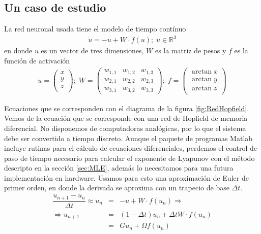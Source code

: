 \subsection{Un caso de estudio}

La red neuronal usada tiene el modelo de tiempo contínuo
\begin{eqnarray}\label{eq:ModTiempCont}
\dot{u} = -u + W \cdot f(u); \; u \in \mathbb{R}^3
\end{eqnarray}
en donde $u$ es un vector de tres dimensiones, $W$ es la matriz de pesos y $f$ es la función de activación
\begin{eqnarray}\label{eq:uWf}
u =
\left( \begin{array}{c}
x\\
y\\
z\\
\end{array} \right)
; \;
W =
\left( \begin{array}{ccc}
w_{1,1} & w_{1,2} & w_{1,3}\\
w_{2,1} & w_{2,2} & w_{2,3}\\
w_{3,1} & w_{3,2} & w_{3,3}
\end{array} \right)
; \;
f =
\left( \begin{array}{c}
\arctan x\\
\arctan y\\
\arctan z\\
\end{array} \right)
\end{eqnarray}


Ecuaciones que se corresponden con el diagrama de la figura \ref{fig:RedHopfield}.
Vemos de la ecuación que se corresponde con una red de Hopfield de memoria diferencial.
No disponemos de computadoras analógicas, por lo que el sistema debe ser convertido a tiempo discreto.
Aunque el paquete de programas Matlab incluye rutinas para el cálculo de ecuaciones diferenciales, perdemos el control de paso de tiempo necesario para calcular el
exponente de Lyapunov con el método descripto en la sección \ref{sec:MLE}, además lo necesitamos para una futura implementación en hardware.
Usamos para esto una aproximación de Euler de primer orden, en donde la derivada se aproxima con un trapecio de base $\Delta t$.
\begin{eqnarray}\label{eq:EulerRNA}
	\dfrac{u_{n+1}-u_n}{\Delta t} \approx \dot{u}_n &=& -u + W \cdot f(u_n) \Rightarrow\\ \nonumber
	\Rightarrow u_{n+1} &=& (1 - \Delta t)u_n + \Delta t W \cdot f(u_n)\\ \nonumber
						 &=& Gu_n + \Omega f(u_n)
\end{eqnarray}

